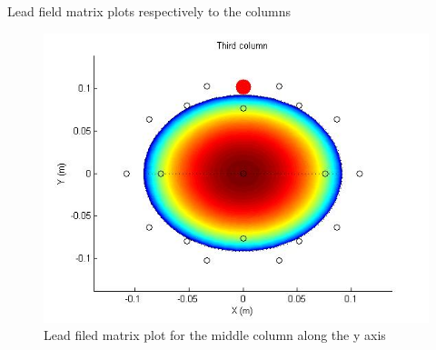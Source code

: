 \documentclass[t,12pt,english
\ifx\beamermode\undefined\else,\beamermode\fi
]{beamer}
\begin{document}
\begin{frame}{Lead field matrix plots respectively to the columns}
\begin{figure}[!htbp]
\centering
\includegraphics[width=1\textwidth]{8.jpg}\\
\tiny{Lead filed matrix plot for the middle column along the y axis}
\endminipage\hfill
\end{figure}
    
\end{frame}
\end{document}
